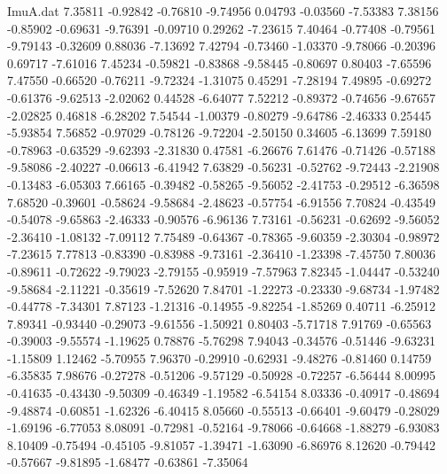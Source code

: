 \begin{filecontents}{ImuA.dat}
   7.35811   -0.92842   -0.76810   -9.74956    0.04793   -0.03560   -7.53383
   7.38156   -0.85902   -0.69631   -9.76391   -0.09710    0.29262   -7.23615
   7.40464   -0.77408   -0.79561   -9.79143   -0.32609    0.88036   -7.13692
   7.42794   -0.73460   -1.03370   -9.78066   -0.20396    0.69717   -7.61016
   7.45234   -0.59821   -0.83868   -9.58445   -0.80697    0.80403   -7.65596
   7.47550   -0.66520   -0.76211   -9.72324   -1.31075    0.45291   -7.28194
   7.49895   -0.69272   -0.61376   -9.62513   -2.02062    0.44528   -6.64077
   7.52212   -0.89372   -0.74656   -9.67657   -2.02825    0.46818   -6.28202
   7.54544   -1.00379   -0.80279   -9.64786   -2.46333    0.25445   -5.93854
   7.56852   -0.97029   -0.78126   -9.72204   -2.50150    0.34605   -6.13699
   7.59180   -0.78963   -0.63529   -9.62393   -2.31830    0.47581   -6.26676
   7.61476   -0.71426   -0.57188   -9.58086   -2.40227   -0.06613   -6.41942
   7.63829   -0.56231   -0.52762   -9.72443   -2.21908   -0.13483   -6.05303
   7.66165   -0.39482   -0.58265   -9.56052   -2.41753   -0.29512   -6.36598
   7.68520   -0.39601   -0.58624   -9.58684   -2.48623   -0.57754   -6.91556
   7.70824   -0.43549   -0.54078   -9.65863   -2.46333   -0.90576   -6.96136
   7.73161   -0.56231   -0.62692   -9.56052   -2.36410   -1.08132   -7.09112
   7.75489   -0.64367   -0.78365   -9.60359   -2.30304   -0.98972   -7.23615
   7.77813   -0.83390   -0.83988   -9.73161   -2.36410   -1.23398   -7.45750
   7.80036   -0.89611   -0.72622   -9.79023   -2.79155   -0.95919   -7.57963
   7.82345   -1.04447   -0.53240   -9.58684   -2.11221   -0.35619   -7.52620
   7.84701   -1.22273   -0.23330   -9.68734   -1.97482   -0.44778   -7.34301
   7.87123   -1.21316   -0.14955   -9.82254   -1.85269    0.40711   -6.25912
   7.89341   -0.93440   -0.29073   -9.61556   -1.50921    0.80403   -5.71718
   7.91769   -0.65563   -0.39003   -9.55574   -1.19625    0.78876   -5.76298
   7.94043   -0.34576   -0.51446   -9.63231   -1.15809    1.12462   -5.70955
   7.96370   -0.29910   -0.62931   -9.48276   -0.81460    0.14759   -6.35835
   7.98676   -0.27278   -0.51206   -9.57129   -0.50928   -0.72257   -6.56444
   8.00995   -0.41635   -0.43430   -9.50309   -0.46349   -1.19582   -6.54154
   8.03336   -0.40917   -0.48694   -9.48874   -0.60851   -1.62326   -6.40415
   8.05660   -0.55513   -0.66401   -9.60479   -0.28029   -1.69196   -6.77053
   8.08091   -0.72981   -0.52164   -9.78066   -0.64668   -1.88279   -6.93083
   8.10409   -0.75494   -0.45105   -9.81057   -1.39471   -1.63090   -6.86976
   8.12620   -0.79442   -0.57667   -9.81895   -1.68477   -0.63861   -7.35064

\end{filecontents}
